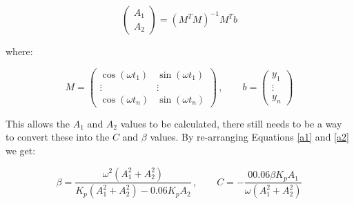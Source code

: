 \lesspace

\begin{equation}\label{lls}
\left(\begin{array}{c}A_1\\A_2\end{array}\right) = \left(M^T M\right)^{-1} M^T b
\end{equation}

where:

\lessspace

\begin{equation}
  M = \left(
    \begin{array}{cc}
      \cos\left(\omega t_1\right) & \sin\left(\omega t_1\right) \\
      \vdots & \vdots \\
      \cos\left(\omega t_n\right) & \sin\left(\omega t_n\right)
    \end{array}
  \right)
  \, ,\qquad
  b = \left(\begin{array}{c}y_1\\\vdots\\y_n\end{array}\right)
\end{equation}

This allows the $A_1$ and $A_2$ values to be calculated, there still needs to be
a way to convert these into the $C$ and $\beta$ values.  By re-arranging
Equations \eqref{a1} and \eqref{a2} we get:

\lesspace

\begin{equation}\label{a-to-bc}
\beta = \frac{\omega^2 \left(A_1^2 + A_2^2\right)}{K_p \left(A_1^2+A_2^2\right)
- 0.06 K_p A_2}\, , \qquad
C = - \frac{00.06 \beta K_p A_1}{\omega \left(A_1^2 + A_2^2\right)}
\end{equation}
